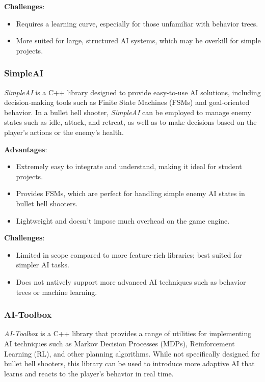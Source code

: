 \documentclass{article} %
\begin{document}
\textbf{Challenges}:
\begin{itemize}
	\item Requires a learning curve, especially for those unfamiliar with behavior trees.
	\item More suited for large, structured AI systems, which may be overkill for simple projects.
\end{itemize}

\subsubsection{SimpleAI}

\textit{SimpleAI} is a C++ library designed to provide easy-to-use AI solutions, including decision-making tools such as Finite State Machines (FSMs) and goal-oriented behavior. In a bullet hell shooter, \textit{SimpleAI} can be employed to manage enemy states such as idle, attack, and retreat, as well as to make decisions based on the player's actions or the enemy’s health.

\textbf{Advantages}:
\begin{itemize}
	\item Extremely easy to integrate and understand, making it ideal for student projects.
	\item Provides FSMs, which are perfect for handling simple enemy AI states in bullet hell shooters.
	\item Lightweight and doesn’t impose much overhead on the game engine.
\end{itemize}

\textbf{Challenges}:
\begin{itemize}
	\item Limited in scope compared to more feature-rich libraries; best suited for simpler AI tasks.
	\item Does not natively support more advanced AI techniques such as behavior trees or machine learning.
\end{itemize}

\subsubsection{AI-Toolbox}

\textit{AI-Toolbox} is a C++ library that provides a range of utilities for implementing AI techniques such as Markov Decision Processes (MDPs), Reinforcement Learning (RL), and other planning algorithms. While not specifically designed for bullet hell shooters, this library can be used to introduce more adaptive AI that learns and reacts to the player’s behavior in real time.
\end{document}
